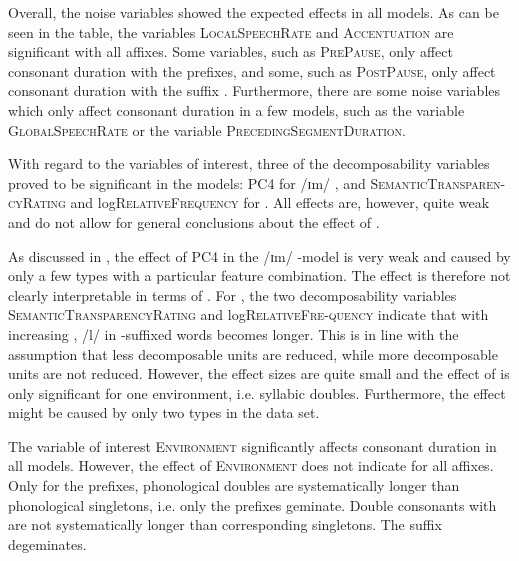 Overall, the noise variables showed the expected effects in all models. As can be seen in the table, the variables \textsc{LocalSpeechRate} and \textsc{Accentuation} are significant with all affixes. 
Some variables, such as \textsc{PrePause}, only affect consonant duration with the prefixes, and some, such as \textsc{PostPause}, only affect consonant duration with the suffix .  
 Furthermore, there are some noise variables which only affect consonant duration in a few models, such as the variable \textsc{GlobalSpeechRate} or the variable \textsc{PrecedingSegmentDuration}. 

With regard to the variables of interest, three of the decomposability variables proved to be significant in the models: \textsc{PC4} for /ɪm/ , and \textsc{SemanticTransparen- cyRating} and log\textsc{RelativeFrequency} for . 
 All effects are, however, quite weak and do not allow for general conclusions about the effect of . 
 
 As discussed in , the effect of \textsc{PC4} in the /ɪm/ -model is very weak and caused by only a few types with a particular feature combination. The effect is therefore not clearly interpretable in terms of . 
 For , the two decomposability variables \textsc{SemanticTransparencyRating} and log\textsc{RelativeFre-quency} indicate that with increasing , /l/ in -suffixed words becomes longer. This is in line with the assumption that less decomposable units are reduced, while more decomposable units are not reduced. However, the effect sizes are quite small and the effect of  is only significant for one environment, i.e. syllabic doubles. 
Furthermore, the effect might be caused by only two types in the data set.


%
The variable of interest \textsc{Environment} significantly affects consonant duration in all models. 
However, the effect of \textsc{Environment} does not indicate  for all affixes. Only for the prefixes, phonological doubles are systematically longer than phonological singletons, i.e. only the prefixes geminate. Double consonants with  are not systematically longer than corresponding singletons. The suffix  degeminates.  


